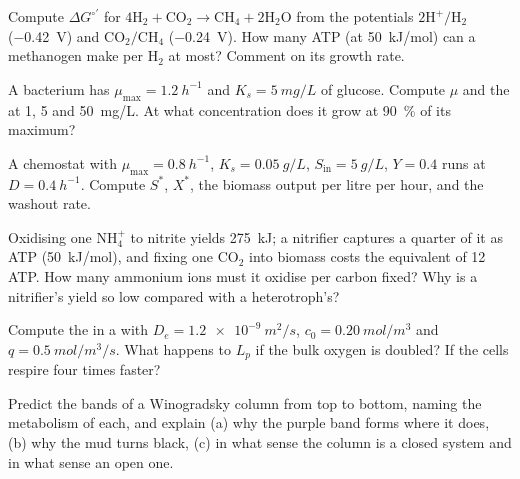 \begin{exercise}[$\star\star$]\label{exo:b2:microbial-metabolism:5}
Compute $\Delta G^{\circ\prime}$ for $4\mathrm{H_2} + \mathrm{CO_2}
\to \mathrm{CH_4} + 2\mathrm{H_2O}$ from the potentials
$\mathrm{2H^+/H_2}$ (\qty{-0.42}{V}) and $\mathrm{CO_2/CH_4}$
(\qty{-0.24}{V}). How many ATP (at \qty{50}{kJ/mol}) can a methanogen
make per $\mathrm{H_2}$ at most? Comment on its growth rate.
\end{exercise}

\begin{exercise}[$\star\star$]\label{exo:b2:microbial-metabolism:6}
A bacterium has $\mu_{\max} = \qty{1.2}{h^{-1}}$ and $K_s =
\qty{5}{mg/L}$ of glucose. Compute $\mu$ and the  at
1, 5 and \qty{50}{mg/L}. At what concentration does it grow at
\qty{90}{\%} of its maximum?
\end{exercise}

\begin{exercise}[$\star\star$]\label{exo:b2:microbial-metabolism:7}
A chemostat with $\mu_{\max} = \qty{0.8}{h^{-1}}$, $K_s =
\qty{0.05}{g/L}$, $S_{\text{in}} = \qty{5}{g/L}$, $Y = 0.4$ runs at
$D = \qty{0.4}{h^{-1}}$. Compute $S^*$, $X^*$, the biomass output
per litre per hour, and the washout rate.
\end{exercise}

\begin{exercise}[$\star\star$]\label{exo:b2:microbial-metabolism:8}
Oxidising one $\mathrm{NH_4^+}$ to nitrite yields \qty{275}{kJ}; a
nitrifier captures a quarter of it as ATP (\qty{50}{kJ/mol}), and
fixing one $\mathrm{CO_2}$ into biomass costs the equivalent of 12
ATP. How many ammonium ions must it oxidise per carbon fixed? Why is
a nitrifier's yield so low compared with a heterotroph's?
\end{exercise}

\begin{exercise}[$\star\star$]\label{exo:b2:microbial-metabolism:9}
Compute the  in a  with $D_e =
\qty{1.2e-9}{m^2/s}$, $c_0 = \qty{0.20}{mol/m^3}$ and $q =
\qty{0.5}{mol/m^3/s}$. What happens to $L_p$ if the bulk oxygen is
doubled? If the cells respire four times faster?
\end{exercise}

\begin{exercise}[$\star\star\star$]\label{exo:b2:microbial-metabolism:10}
Predict the bands of a Winogradsky column from top to bottom, naming
the metabolism of each, and explain (a) why the purple band forms
where it does, (b) why the mud turns black, (c) in what sense the
column is a closed system and in what sense an open one.
\end{exercise}

